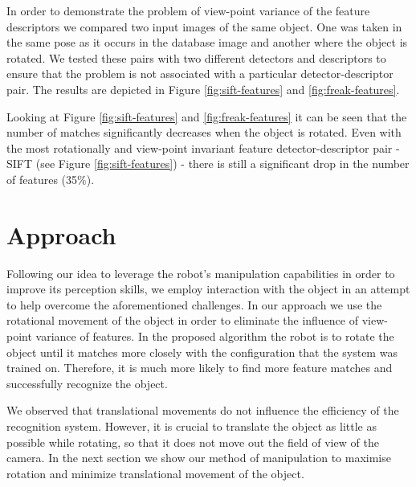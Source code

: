 In order to demonstrate the problem of view-point variance of the feature descriptors we compared two input images of the same object.  One was taken in the same pose as it occurs in the database image and another where the object is rotated. We tested these pairs with two different detectors and descriptors to ensure that the problem is not associated with a particular detector-descriptor pair. The results are depicted in Figure \ref{fig:sift-features} and \ref{fig:freak-features}.%

Looking at Figure \ref{fig:sift-features} and \ref{fig:freak-features} it can be seen that the number of matches significantly decreases when the object is rotated. Even with the most rotationally and view-point invariant feature detector-descriptor pair - SIFT (see Figure \ref{fig:sift-features}) - there is still a significant drop in the number of features (35$\%$).



\section{Approach}

Following our idea to leverage the robot's manipulation capabilities in order to improve its perception skills, we employ interaction with the object in an attempt to help overcome the aforementioned challenges. In our approach we use the rotational movement of the object in order to eliminate the influence of view-point variance of features.  In the proposed algorithm the robot is to rotate the object until it matches more closely with the configuration that the system was trained on. Therefore, it is much more likely to find more feature matches and successfully recognize the object. 

We observed that translational movements do not influence the efficiency of the recognition system. However, it is crucial to translate the object as little as possible while rotating, so that it does not move out the field of view of the camera. In the next section we show our method of manipulation to maximise rotation and minimize translational movement of the object. 


